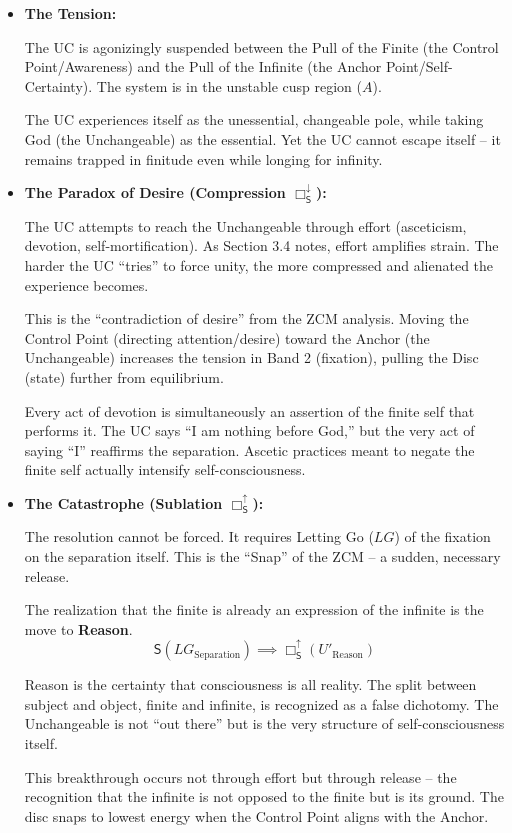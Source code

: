 \documentclass[12pt]{book}
\newcommand{\SBoxUp}{\Box_{\mathsf{S}}^{\uparrow}}
\newcommand{\SBoxDown}{\Box_{\mathsf{S}}^{\downarrow}}
\begin{document}
\begin{itemize}
\item \textbf{The Tension:}

The UC is agonizingly suspended between the Pull of the Finite (the Control Point/Awareness) and the Pull of the Infinite (the Anchor Point/Self-Certainty). The system is in the unstable cusp region ($A$).

The UC experiences itself as the unessential, changeable pole, while taking God (the Unchangeable) as the essential. Yet the UC cannot escape itself -- it remains trapped in finitude even while longing for infinity.

\item \textbf{The Paradox of Desire (Compression $\SBoxDown$):}

The UC attempts to reach the Unchangeable through effort (asceticism, devotion, self-mortification). As Section 3.4 notes, effort amplifies strain. The harder the UC ``tries'' to force unity, the more compressed and alienated the experience becomes.

This is the ``contradiction of desire'' from the ZCM analysis. Moving the Control Point (directing attention/desire) toward the Anchor (the Unchangeable) increases the tension in Band 2 (fixation), pulling the Disc (state) further from equilibrium.

Every act of devotion is simultaneously an assertion of the finite self that performs it. The UC says ``I am nothing before God,'' but the very act of saying ``I'' reaffirms the separation. Ascetic practices meant to negate the finite self actually intensify self-consciousness.

\item \textbf{The Catastrophe (Sublation $\SBoxUp$):}

The resolution cannot be forced. It requires Letting Go ($LG$) of the fixation on the separation itself. This is the ``Snap'' of the ZCM -- a sudden, necessary release.

The realization that the finite is already an expression of the infinite is the move to \textbf{Reason}.
\[
\mathsf{S}(LG_{\text{Separation}}) \implies \SBoxUp(U'_{\text{Reason}})
\]

Reason is the certainty that consciousness is all reality. The split between subject and object, finite and infinite, is recognized as a false dichotomy. The Unchangeable is not ``out there'' but is the very structure of self-consciousness itself.

This breakthrough occurs not through effort but through release -- the recognition that the infinite is not opposed to the finite but is its ground. The disc snaps to lowest energy when the Control Point aligns with the Anchor.
\end{itemize}
\end{document}
